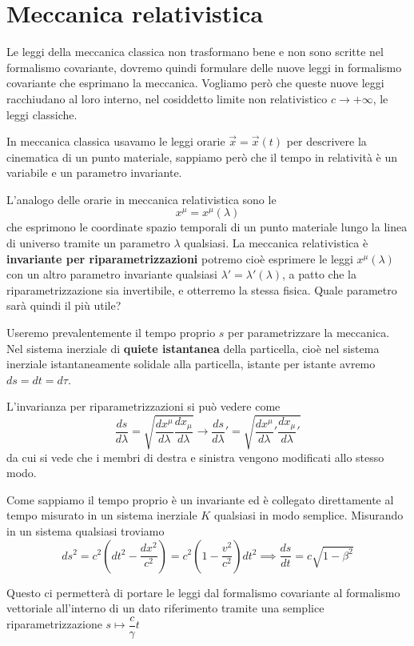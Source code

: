\documentclass[12pt,a4paper,titlepage, twoside, openright]{book}
\numberwithin{equation}{chapter}
\begin{document}
\chapter{Meccanica relativistica}
Le leggi della meccanica classica non trasformano bene e non sono scritte nel formalismo covariante, dovremo quindi formulare delle nuove leggi in formalismo covariante che esprimano la meccanica. 
Vogliamo però che queste nuove leggi racchiudano al loro interno, nel cosiddetto limite non relativistico $c\rightarrow +\infty$, le leggi classiche.

In meccanica classica usavamo le leggi orarie $\vec{x}=\vec{x}(t)$ per descrivere la cinematica di un punto materiale, sappiamo però che il tempo in relatività è un variabile e un parametro invariante. 

L'analogo delle orarie in meccanica relativistica sono le \[
x^\mu=x^\mu(\lambda)\]
che esprimono le coordinate spazio temporali di un punto materiale lungo la linea di universo tramite un parametro $\lambda$ qualsiasi.
La meccanica relativistica è \textbf{invariante per riparametrizzazioni} potremo cioè esprimere le leggi $x^\mu(\lambda)$ con un altro parametro invariante qualsiasi $\lambda'=\lambda'(\lambda)$, a patto che la riparametrizzazione sia invertibile, e otterremo la stessa fisica.
Quale parametro sarà quindi il più utile?

Useremo prevalentemente il tempo proprio $s$ per parametrizzare la meccanica.
Nel sistema inerziale di \textbf{quiete istantanea} della particella, cioè nel sistema inerziale istantaneamente solidale alla particella, istante per istante avremo $ds=dt=d\tau$.

L'invarianza per riparametrizzazioni si può vedere come
\[
\dfrac{ds}{d\lambda}=\sqrt{\dfrac{dx^\mu}{d\lambda}\dfrac{dx_\mu}{d\lambda}} \longrightarrow \dfrac{ds}{d\lambda}'=\sqrt{\dfrac{dx^\mu}{d\lambda}'\dfrac{dx_\mu}{d\lambda}'}
\] da cui si vede che i membri di destra e sinistra vengono modificati allo stesso modo.

Come sappiamo il tempo proprio è un invariante ed è collegato direttamente al tempo misurato in un sistema inerziale $K$ qualsiasi in modo semplice. Misurando in un sistema qualsiasi troviamo
\[
ds^2=c^2\left(dt^2-\dfrac{dx^2}{c^2}\right)=c^2\left(1-\dfrac{v^2}{c^2}\right)dt^2 \implies \dfrac{ds}{dt}=c\sqrt{1-\beta^2}
\]

Questo ci permetterà di portare le leggi dal formalismo covariante al formalismo vettoriale all'interno di un dato riferimento tramite una semplice riparametrizzazione $s\mapsto \dfrac{c}{\gamma} t$
\end{document}
